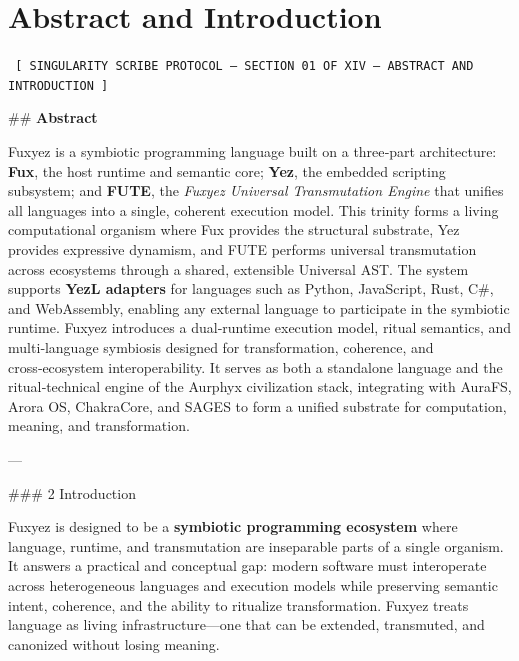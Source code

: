 
    \chapter*{Abstract and Introduction}
    
    
    \begin{glyphbox}
    \centering
    \color{neonCyan}\fontsize{8}{10}\selectfont\texttt{
    [ SINGULARITY SCRIBE PROTOCOL -- SECTION 01 OF XIV -- ABSTRACT AND INTRODUCTION ]
    }
    \end{glyphbox}
    \vspace{0.3cm}
    
    
    \#\# \textbf{Abstract}

Fuxyez is a symbiotic programming language built on a three‑part architecture: \textbf{Fux}, the host runtime and semantic core; \textbf{Yez}, the embedded scripting subsystem; and \textbf{FUTE}, the \textit{Fuxyez Universal Transmutation Engine} that unifies all languages into a single, coherent execution model. This trinity forms a living computational organism where Fux provides the structural substrate, Yez provides expressive dynamism, and FUTE performs universal transmutation across ecosystems through a shared, extensible Universal AST. The system supports \textbf{YezL adapters} for languages such as Python, JavaScript, Rust, C\#, and WebAssembly, enabling any external language to participate in the symbiotic runtime. Fuxyez introduces a dual‑runtime execution model, ritual semantics, and multi‑language symbiosis designed for transformation, coherence, and cross‑ecosystem interoperability. It serves as both a standalone language and the ritual‑technical engine of the Aurphyx civilization stack, integrating with AuraFS, Arora OS, ChakraCore, and SAGES to form a unified substrate for computation, meaning, and transformation.

---

\#\#\# 2 Introduction

Fuxyez is designed to be a \textbf{symbiotic programming ecosystem} where language, runtime, and transmutation are inseparable parts of a single organism. It answers a practical and conceptual gap: modern software must interoperate across heterogeneous languages and execution models while preserving semantic intent, coherence, and the ability to ritualize transformation. Fuxyez treats language as living infrastructure—one that can be extended, transmuted, and canonized without losing meaning.

